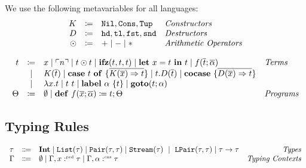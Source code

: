 \begin{definition}
    We use the following metavariables for all languages:
    \[
      \begin{array}{rcll}
        K & \coloneqq & \mathtt{Nil}, \mathtt{Cons}, \mathtt{Tup} & \emph{Constructors}\\
        D & \coloneqq & \mathtt{hd}, \mathtt{tl}, \mathtt{fst}, \mathtt{snd} & \emph{Destructors}\\
        \odot  & \coloneqq & + \mid - \mid * & \emph{Arithmetic Operators}
      \end{array}
    \]
  \end{definition}
  
  \begin{definition}
    \[ 
      \begin{array}{r c l l}
        t & \coloneqq & x \mid \ulcorner n \urcorner \mid t \odot t \mid \mathbf{ifz}(t, t, t) \mid \mathbf{let}\ x = t\ \mathbf{in}\ t \mid f(\overline{t}; \overline{\alpha}) & \emph{Terms}\\
        & \mid & K(\overline{t}) \mid \mathbf{case}\ t\ \mathbf{of}\ \{ \overline{K(\overline{x}) \Rightarrow t} \} \mid t.D(\overline{t}) \mid \mathbf{cocase}\ \{ \overline{D(\overline{x}) \Rightarrow t} \} & \\
        & \mid & \lambda x.t \mid t\ t \mid \mathbf{label}\ \alpha\ \{t \} \mid \mathbf{goto}(t; \alpha) & \\
        \Theta & \coloneqq & \emptyset \mid \mathbf{def}\ f(\overline{x};\overline{\alpha}) \coloneq t; \Theta & \emph{Programs}\\
      \end{array}
    \]
  \end{definition}

\subsection{Typing Rules}
\label{subsec:fun:typing-rules}

\begin{definition}
  \[
    \begin{array}{l c l r}
      \tau   & \Coloneqq & \tyint \mid \mathtt{List}(\tau) \mid \mathtt{Pair}(\tau,\tau) \mid \mathtt{Stream}(\tau)\ \mid\ \mathtt{LPair}(\tau,\tau) \mid \tau \to \tau & \emph{Types}\\
      \Gamma & \Coloneqq & \emptyset \mid \Gamma, x \prd \tau \mid \Gamma, \alpha \cnt \tau & \emph{Typing Contexts}
    \end{array}
  \]
\end{definition}

